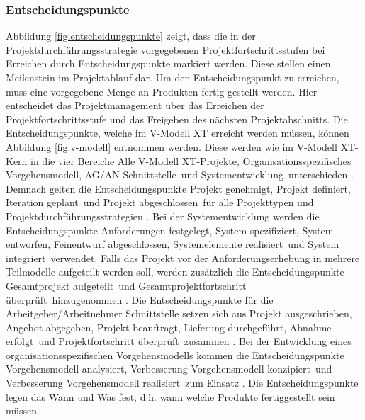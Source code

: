  \subsubsection{Entscheidungspunkte}
Abbildung \ref{fig:entscheidungspunkte} zeigt, dass die in der Projektdurchführungsstrategie vorgegebenen Projektfortschrittsstufen bei Erreichen durch Entscheidungspunkte markiert werden. Diese stellen einen Meilenstein im Projektablauf dar. Um den Entscheidungspunkt zu erreichen, muss eine vorgegebene Menge an Produkten fertig gestellt werden. Hier entscheidet das Projektmanagement über das Erreichen der Projektfortschrittsstufe und das Freigeben des nächsten Projektabschnitts. Die Entscheidungspunkte, welche im V-Modell XT erreicht werden müssen, können Abbildung \ref{fig:v-modell} entnommen werden. Diese werden wie im V-Modell XT-Kern in die vier Bereiche \grqq Alle V-Modell XT-Projekte\grqq, \grqq Organisationsspezifisches Vorgehensmodell\grqq, \grqq AG/AN-Schnittstelle\grqq \ und \grqq Systementwicklung\grqq \ unterschieden \cite{2004vmodell}. \newline
Demnach gelten die Entscheidungspunkte \grqq Projekt genehmigt\grqq, \grqq Projekt definiert, \grqq Iteration geplant\grqq \ und \grqq Projekt abgeschlossen\grqq \ für alle Projekttypen und Projektdurchführungsstrategien \cite{2004vmodell}. \newline
Bei der Systementwicklung werden die Entscheidungspunkte \grqq Anforderungen festgelegt\grqq, \grqq System spezifiziert\grqq, \grqq System entworfen\grqq, \grqq Feinentwurf abgeschlossen\grqq, \grqq Systemelemente realisiert\grqq \ und \grqq System integriert\grqq \ verwendet. Falls das Projekt vor der Anforderungserhebung in mehrere Teilmodelle aufgeteilt werden soll, werden zusätzlich die Entscheidungspunkte \grqq Gesamtprojekt aufgeteilt\grqq \ und \grqq Gesamtprojektfortschritt überprüft\grqq \ hinzugenommen \cite{2004vmodell}. \newline
Die Entscheidungspunkte für die Arbeitgeber/Arbeitnehmer Schnittstelle setzen sich aus \grqq Projekt ausgeschrieben\grqq, \grqq Angebot abgegeben\grqq, \grqq Projekt beauftragt\grqq, \grqq Lieferung durchgeführt\grqq, \grqq Abnahme erfolgt\grqq \ und \grqq Projektfortschritt überprüft\grqq \ zusammen \cite{2004vmodell}. \newline
 Bei der Entwicklung eines organisationsspezifischen Vorgehensmodells kommen die Entscheidungspunkte \grqq Vorgehensmodell analysiert\grqq, \grqq Verbesserung Vorgehensmodell konzipiert\grqq \ und \grqq Verbesserung Vorgehensmodell realisiert\grqq \ zum Einsatz \cite{2004vmodell}. \newline
 Die Entscheidungspunkte legen das \grqq Wann\grqq {} und \grqq Was\grqq {} fest, d.h. wann welche Produkte fertiggestellt sein müssen.

